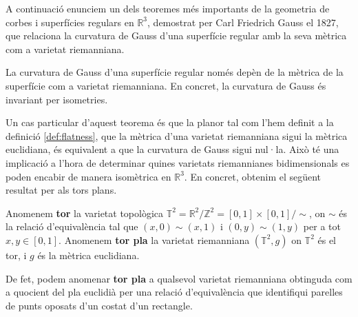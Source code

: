 A continuació enunciem un dels teoremes més importants de la geometria de corbes i superfícies regulars en $\mathbb R^3$, demostrat per Carl Friedrich Gauss el 1827, que relaciona la curvatura de Gauss d'una superfície regular amb la seva mètrica com a varietat riemanniana.

\begin{teo}
    La curvatura de Gauss d'una superfície regular només depèn de la mètrica de la superfície com a varietat riemanniana. En concret, la curvatura de Gauss és invariant per isometries. 
\end{teo}

Un cas particular d'aquest teorema és que la planor tal com l'hem definit a la definició \ref{def:flatness}, que la mètrica d'una varietat riemanniana sigui la mètrica euclidiana, és equivalent a que la curvatura de Gauss sigui nul·la. Això té una implicació a l'hora de determinar quines varietats riemannianes bidimensionals es poden encabir de manera isomètrica en $\mathbb R^3$. En concret, obtenim el següent resultat per als tors plans. 

\begin{defi}
    Anomenem \textbf{tor} la varietat topològica $\mathbb T^2 = \mathbb R^2/\mathbb Z^2 = [0,1]\times[0,1]/\sim$, on $\sim$ és la relació d'equivalència tal que $(x,0)\sim(x,1)$ i $(0,y)\sim(1,y)$ per a tot $x,y\in[0,1]$. Anomenem \textbf{tor pla} la varietat riemanniana $(\mathbb T^2, g)$ on $\mathbb T^2$ és el tor, i $g$ és la mètrica euclidiana.
\end{defi}

\begin{obs}
    De fet, podem anomenar \textbf{tor pla} a qualsevol varietat riemanniana obtinguda com a quocient del pla euclidià per una relació d'equivalència que identifiqui parelles de punts oposats d'un costat d'un rectangle.
\end{obs}

